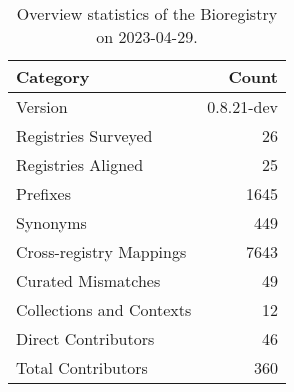 \begin{table}
\centering
\caption{Overview statistics of the Bioregistry on 2023-04-29.}
\label{tab:bioregistry-summary}
\begin{tabular}{lr}
\toprule
                Category &      Count \\
\midrule
                 Version & 0.8.21-dev \\
     Registries Surveyed &         26 \\
      Registries Aligned &         25 \\
                Prefixes &       1645 \\
                Synonyms &        449 \\
 Cross-registry Mappings &       7643 \\
      Curated Mismatches &         49 \\
Collections and Contexts &         12 \\
     Direct Contributors &         46 \\
      Total Contributors &        360 \\
\bottomrule
\end{tabular}
\end{table}
